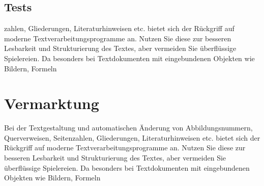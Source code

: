 \subsection{Tests}
zahlen, Gliederungen, Literaturhinweisen etc. bietet sich der Rückgriff
auf moderne Textverarbeitungsprogramme an. Nutzen Sie diese zur besseren Lesbarkeit
und Strukturierung des Textes, aber vermeiden Sie überflüssige Spielereien. Da
besonders bei Textdokumenten mit eingebundenen Objekten wie Bildern, Formeln

\section{Vermarktung}
Bei der Textgestaltung und automatischen Änderung von Abbildungsnummern, Querverweisen,
Seitenzahlen, Gliederungen, Literaturhinweisen etc. bietet sich der Rückgriff
auf moderne Textverarbeitungsprogramme an. Nutzen Sie diese zur besseren Lesbarkeit
und Strukturierung des Textes, aber vermeiden Sie überflüssige Spielereien. Da
besonders bei Textdokumenten mit eingebundenen Objekten wie Bildern, Formeln
